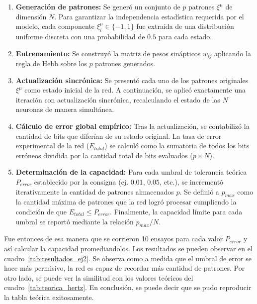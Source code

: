 \begin{enumerate}
	\item \textbf{Generación de patrones:} Se generó un conjunto de $p$ patrones $\xi^\mu$ de dimensión $N$. Para garantizar la independencia estadística requerida por el modelo, cada componente $\xi_i^\mu \in \{-1, 1\}$ fue extraída de una distribución uniforme discreta con una probabilidad de $0.5$ para cada estado.
	
	\item \textbf{Entrenamiento:} Se construyó la matriz de pesos sinápticos $w_{ij}$ aplicando la regla de Hebb sobre los $p$ patrones generados.
	
	\item \textbf{Actualización sincrónica:} Se presentó cada uno de los patrones originales $\xi^\mu$ como estado inicial de la red. A continuación, se aplicó exactamente una iteración con actualización sincrónica, recalculando el estado de las $N$ neuronas de manera simultánea.
	
	\item \textbf{Cálculo de error global empírico:} Tras la actualización, se contabilizó la cantidad de bits que diferían de su estado original. La tasa de error experimental de la red ($E_{total}$) se calculó como la sumatoria de todos los bits erróneos dividida por la cantidad total de bits evaluados ($p \times N$).
	
	\item \textbf{Determinación de la capacidad:} Para cada umbral de tolerancia teórica $P_{error}$ establecido por la consigna (ej. $0.01$, $0.05$, etc.), se incrementó iterativamente la cantidad de patrones almacenados $p$. Se definió a $p_{max}$ como la cantidad máxima de patrones que la red logró procesar cumpliendo la condición de que $E_{total} \leq P_{error}$. Finalmente, la capacidad límite para cada umbral se reportó mediante la relación $p_{max}/N$.
\end{enumerate}

Fue entonces de esa manera que se corrieron 10 ensayos para cada valor $P_{error}$ y así calcular la capacidad promediandolos. Los resultados se pueden observar en el cuadro~\ref{tab:resultados_ej2}. Se observa como a medida que el umbral de error se hace más permisivo, la red es capaz de recordar más cantidad de patrones. Por otro lado, se puede ver la similitud con los valores teóricos del cuadro~\ref{tab:teorica_hertz}. En conclusión, se puede decir que se pudo reproducir la tabla teórica exitosamente.


